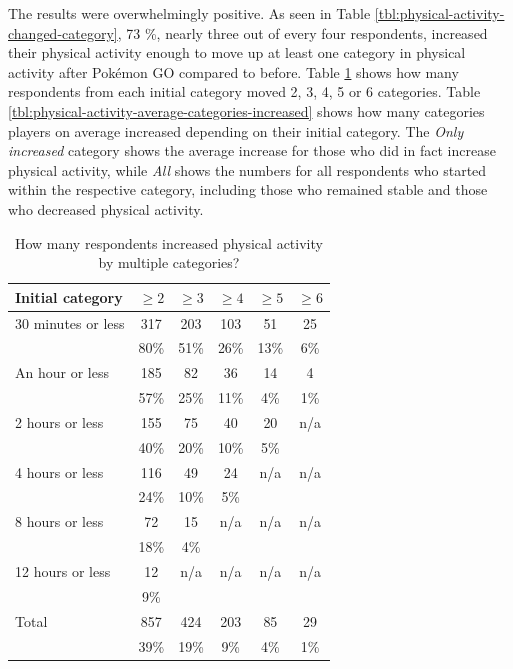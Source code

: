 The results were overwhelmingly positive. As seen in Table \ref{tbl:physical-activity-changed-category}, 73 \%, nearly three out of every four respondents, increased their physical activity enough to move up at least one category in physical activity after Pokémon GO compared to before. Table \ref{tbl:physical-activity-increased-multiple-categories} shows how many respondents from each initial category moved 2, 3, 4, 5 or 6 categories. Table \ref{tbl:physical-activity-average-categories-increased} shows how many categories players on average increased depending on their initial category. The \emph{Only increased} category shows the average increase for those who did in fact increase physical activity, while \emph{All} shows the numbers for all respondents who started within the respective category, including those who remained stable and those who decreased physical activity. 

\begin{table}[h]
	\centering
	\caption{How many respondents increased physical activity by multiple categories?}
	\label{tbl:physical-activity-increased-multiple-categories}
	\begin{tabular}{|l|c|c|c|c|c|}
		\hline
		\textbf{Initial category} & \textbf{\( \geq2 \)} & \textbf{\( \geq3 \)} & \textbf{\( \geq4 \)}	& \textbf{\( \geq5 \)} & \textbf{\( \geq6 \)}\\
		\hline\hline
		30 minutes or less	& 317	& 203	& 103	& 51	& 25\\
							& 80\%	& 51\%	& 26\%	& 13\%	& 6\%\\\hline
		An hour or less		& 185	& 82	& 36	& 14	& 4\\
							& 57\%	& 25\%	& 11\%	& 4\%	& 1\%\\\hline
		2 hours or less		& 155	& 75	& 40	& 20	& n/a\\
							& 40\%	& 20\%	& 10\%	& 5\%	&\\\hline
		4 hours or less		& 116	& 49	& 24	& n/a	& n/a\\
							& 24\%	& 10\%	& 5\%	&		&\\\hline
		8 hours or less		& 72	& 15	& n/a	& n/a	& n/a\\
							& 18\%	& 4\%	& 		&		&\\\hline
		12 hours or less	& 12	& n/a	& n/a	& n/a	& n/a\\
							& 9\%	& 		&		&		&\\\hline
		\hline
		Total				& 857	& 424	& 203	& 85	& 29\\
							& 39\%	& 19\%	& 9\%	& 4\%	& 1\%\\\hline
	\end{tabular}
\end{table}

